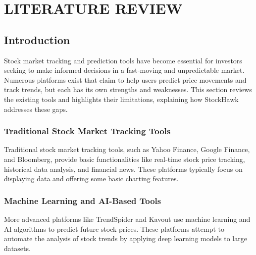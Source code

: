 \chapter{LITERATURE REVIEW}
\section{ Introduction}
Stock market tracking and prediction tools have become essential for investors seeking to make informed decisions in a fast-moving and unpredictable market. Numerous platforms exist that claim to help users predict price movements and track trends, but each has its own strengths and weaknesses. This section reviews the existing tools and highlights their limitations, explaining how StockHawk addresses these gaps.

\subsection {Traditional Stock Market Tracking Tools}

Traditional stock market tracking tools, such as Yahoo Finance, Google Finance, and Bloomberg, provide basic functionalities like real-time stock price tracking, historical data analysis, and financial news. These platforms typically focus on displaying data and offering some basic charting features.




\subsection {Machine Learning and AI-Based Tools}

More advanced platforms like TrendSpider and Kavout use machine learning and AI algorithms to predict future stock prices. These platforms attempt to automate the analysis of stock trends by applying deep learning models to large datasets.

